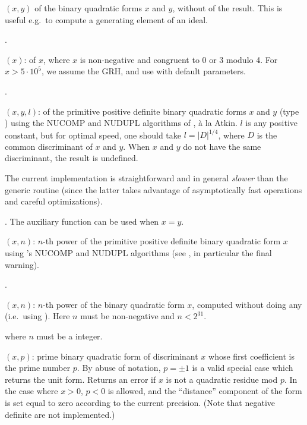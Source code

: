 $(x,y)$  of the binary quadratic forms
$x$ and $y$, without  of the result. This is useful e.g.~to
compute a generating element of an ideal.

.

$(x)$:  of $x$, where
$x$ is non-negative and congruent to 0 or 3 modulo 4. For $x > 5\cdot
10^5$, we assume the GRH, and use  with default
parameters.

.

$(x,y,l)$:  of the primitive positive
definite binary quadratic forms $x$ and $y$ (type ) using the NUCOMP
and NUDUPL algorithms of , \`a la Atkin. $l$ is any positive
constant, but for optimal speed, one should take $l=|D|^{1/4}$, where $D$ is
the common discriminant of $x$ and $y$. When $x$ and $y$ do not have the same
discriminant, the result is undefined.

The current implementation is straightforward and in general \emph{slower}
than the generic routine (since the latter takes advantage of asymptotically
fast operations and careful optimizations).

. The auxiliary function  can be
used when $x=y$.

$(x,n)$: $n$-th power of the primitive positive definite
binary quadratic form $x$ using 's NUCOMP and NUDUPL algorithms
(see , in particular the final warning).

.

$(x,n)$: $n$-th power of the binary quadratic form
$x$, computed without doing any  (i.e.~using ).
Here $n$ must be non-negative and $n<2^{31}$.

 where $n$ must be a 
integer.

$(x,p)$: prime binary quadratic form of discriminant
$x$ whose first coefficient is the prime number $p$. By abuse of notation,
$p = \pm 1$ is a valid special case which returns the unit form. Returns an
error if $x$ is not a quadratic residue mod $p$. In the case where $x>0$,
$p < 0$ is allowed, and the ``distance'' component of the form is set equal
to zero according to the current precision. (Note that negative definite
 are not implemented.)

